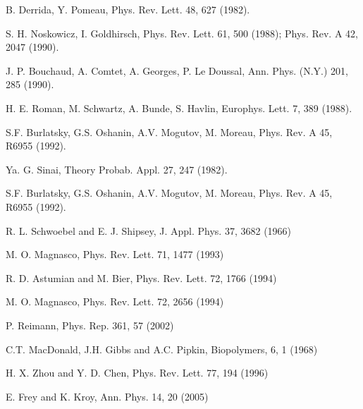 \documentclass[aps,pre,floats,floatfix,twocolumn]{revtex4}
\begin{document}
\begin{thebibliography}{99}

B. Derrida, Y. Pomeau, 
Phys. Rev. Lett. 48, 627 (1982).

S. H. Noskowicz, I. Goldhirsch,
Phys. Rev. Lett. 61, 500 (1988); 
Phys. Rev. A 42, 2047 (1990). 

J. P. Bouchaud, A. Comtet, A. Georges, P. Le Doussal,
Ann. Phys. (N.Y.) 201, 285 (1990).

H. E. Roman, M. Schwartz, A. Bunde, S. Havlin, 
Europhys. Lett. 7, 389 (1988). 

S.F. Burlatsky, G.S. Oshanin, A.V. Mogutov, M. Moreau,   
Phys. Rev. A 45, R6955 (1992). 

Ya. G. Sinai, 
Theory Probab. Appl. 27, 247 (1982).

S.F. Burlatsky, G.S. Oshanin, A.V. Mogutov, M. Moreau,   
Phys. Rev. A 45, R6955 (1992). 



R. L. Schwoebel and E. J. Shipsey, J. Appl. Phys. 37, 3682 (1966) 

M. O. Magnasco, Phys. Rev. Lett. 71, 1477 (1993) 

R. D. Astumian and M. Bier, Phys. Rev. Lett. 72, 1766 (1994)

M. O. Magnasco, Phys. Rev. Lett. 72, 2656 (1994)

P. Reimann, Phys. Rep. 361, 57 (2002)

C.T. MacDonald, J.H. Gibbs and A.C. Pipkin, Biopolymers, 6, 1 (1968)

H. X. Zhou and Y. D. Chen, Phys. Rev. Lett. 77, 194 (1996) 

E. Frey and K. Kroy, Ann. Phys. 14, 20 (2005)


\end{thebibliography}
\end{document}
